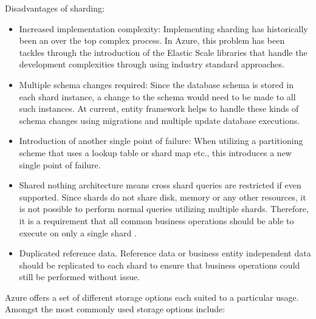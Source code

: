  
Disadvantages of sharding:
\begin{itemize}
\item Increased implementation complexity: Implementing sharding has historically been an over the top complex process. In Azure, this problem has been tackles through the introduction of the Elastic Scale libraries that handle the development complexities through using industry standard approaches.
\item Multiple schema changes required: Since the database schema is stored in each shard instance, a change to the schema would need to be made to all such instances. At current, entity framework helps to handle these kinds of schema changes using migrations and multiple update database executions.
\item Introduction of another single point of failure: When utilizing a partitioning scheme that uses a lookup table or shard map etc., this introduces a new single point of failure.
\item Shared nothing architecture means cross shard queries are restricted if even supported. Since shards do not share disk, memory or any other resources, it is not possible to perform normal queries utilizing multiple shards. Therefore, it is a requirement that all common business operations should be able to execute on only a single shard \cite{Wilder2012-so}.
\item Duplicated reference data. Reference data or business entity independent data should be replicated to each shard to ensure that business operations could still be performed without issue.
\end{itemize}
 
Azure offers a set of different storage options each suited to a particular usage. Amongst the most commonly used storage options include:

